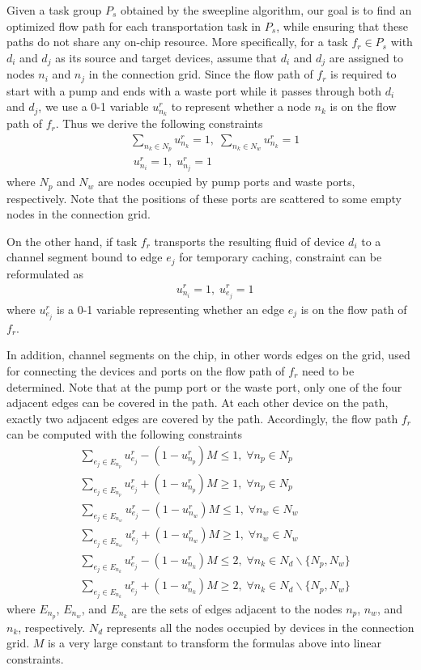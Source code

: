Given a task group $P_s$ obtained by the sweepline algorithm, our goal is to find an optimized flow path for each transportation task in $P_s$, while ensuring that these paths do not share any on-chip resource. More specifically, for a task $f_r\in P_s$ with $d_i$ and $d_j$ as its source and target devices, assume that $d_i$ and $d_j$ are assigned to nodes $n_i$ and $n_j$ in the connection grid. Since the flow path of $f_r$ is required to start with a pump and ends with a waste port while it passes through both $d_i$ and $d_j$, we use a 0-1 variable $u^r_{n_k}$  to represent whether a node $n_k$ is on the flow path of $f_r$. Thus we derive the following constraints
\begin{align}
& \sum_{n_k\in N_p}u^r_{n_k} = 1,\; \sum_{n_k\in N_w}u^r_{n_k} = 1 \label{eq:flow_node_1} \\
&\;  u^r_{n_i} = 1,\; u^r_{n_j} = 1\label{eq:flow_node_2}
\end{align}
where $N_p$ and $N_w$ are nodes occupied by pump ports and waste ports, respectively. Note that the positions of these ports are scattered to some empty nodes in the connection grid.

On the other hand, if task $f_r$ transports the resulting fluid of device $d_i$ to a channel segment bound to edge $e_j$ for temporary caching, constraint \text{(\ref{eq:flow_node_2})} can be reformulated as
\begin{align}
&  u^r_{n_i} = 1,\; u^r_{e_j} = 1\label{eq:flow_node_3}
\end{align}
where $u^r_{e_j}$ is a 0-1 variable representing whether an edge $e_j$ is on the flow path of $f_r$.

In addition, channel segments on the chip, in other words edges on the grid, used for connecting the devices and ports on the flow path of $f_r$ need to be determined. Note that at the pump port or the waste port, only one of the four adjacent edges can be covered in the path. At each other device on the path, exactly two adjacent edges are covered by the path. Accordingly, the flow path $f_r$ can be computed with the following constraints
\begin{align}\label{eq:continuous}
&  \sum_{e_j\in E_{n_p}}u^r_{e_j} - (1-u^r_{n_p})M \leq 1,\; \forall n_p\in N_p\\
&  \sum_{e_j\in E_{n_p}}u^r_{e_j} + (1-u^r_{n_p})M \geq 1,\; \forall n_p\in N_p\\
&  \sum_{e_j\in E_{n_w}}u^r_{e_j} - (1-u^r_{n_w})M \leq 1,\; \forall n_w\in N_w\\
&  \sum_{e_j\in E_{n_w}}u^r_{e_j} + (1-u^r_{n_w})M \geq 1,\; \forall n_w\in N_w\\
&  \sum_{e_j\in E_{n_k}}u^r_{e_j} - (1-u^r_{n_k})M \leq 2,\; \forall n_k\in N_d\backslash \{N_p,N_w\}\\
&  \sum_{e_j\in E_{n_k}}u^r_{e_j} + (1-u^r_{n_k})M \geq 2,\; \forall n_k\in N_d\backslash \{N_p,N_w\}\label{eq:continuous_last}
\end{align}
where $E_{n_p}$, $E_{n_w}$, and $E_{n_k}$ are the sets of edges adjacent to the nodes $n_p$, $n_w$, and $n_k$, respectively. $N_d$ represents all the nodes occupied by devices in the connection grid. $M$ is a very large constant to transform the formulas above into linear constraints.

